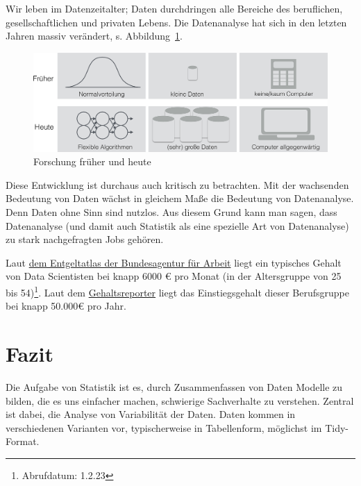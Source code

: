 \documentclass[
  a4paper,
  DIV=11]{scrreprt}
\theoremstyle{definition}
\theoremstyle{definition}
\theoremstyle{remark}
\begin{document}
Wir leben im Datenzeitalter; Daten durchdringen alle Bereiche des
beruflichen, gesellschaftlichen und privaten Lebens. Die Datenanalyse
hat sich in den letzten Jahren massiv verändert, s.
Abbildung~\ref{fig-fo-früher-heute}.

\begin{figure}

{\centering \includegraphics{./img/Forschung_frueher_heute-crop.png}

}

\caption{\label{fig-fo-früher-heute}Forschung früher und heute}

\end{figure}

Diese Entwicklung ist durchaus auch kritisch zu betrachten. Mit der
wachsenden Bedeutung von Daten wächst in gleichem Maße die Bedeutung von
Datenanalyse. Denn Daten ohne Sinn sind nutzlos. Aus diesem Grund kann
man sagen, dass Datenanalyse (und damit auch Statistik als eine
spezielle Art von Datenanalyse) zu stark nachgefragten Jobs gehören.

Laut \href{https://web.arbeitsagentur.de/entgeltatlas/beruf/129987}{dem
Entgeltatlas der Bundesagentur für Arbeit} liegt ein typisches Gehalt
von Data Scientisten bei knapp 6000 € pro Monat (in der Altersgruppe von
25 bis 54)\footnote{Abrufdatum: 1.2.23}. Laut dem
\href{https://gehaltsreporter.de/gehaelter-von-a-bis-z/it/data-scientist/}{Gehaltsreporter}
liegt das Einstiegsgehalt dieser Berufsgruppe bei knapp 50.000€ pro
Jahr.

\hypertarget{fazit}{%
\section{Fazit}\label{fazit}}

Die Aufgabe von Statistik ist es, durch Zusammenfassen von Daten Modelle
zu bilden, die es uns einfacher machen, schwierige Sachverhalte zu
verstehen. Zentral ist dabei, die Analyse von Variabilität der Daten.
Daten kommen in verschiedenen Varianten vor, typischerweise in
Tabellenform, möglichst im Tidy-Format.
\end{document}
